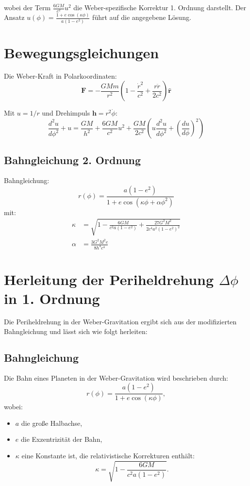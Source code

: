 wobei der Term \(\frac{6GM}{c^2} u^2\) die Weber-spezifische Korrektur 1. Ordnung darstellt. Der Ansatz \(u(\phi) = \frac{1 + e \cos(\kappa\phi)}{a(1 - e^2)}\) führt auf die angegebene Lösung.

\section{Bewegungsgleichungen}
Die Weber-Kraft in Polarkoordinaten:
\begin{equation}
\mathbf{F} = -\frac{GMm}{r^2}\left(1 - \frac{\dot{r}^2}{c^2} + \frac{r\ddot{r}}{2c^2}\right)\mathbf{\hat{r}}
\end{equation}

Mit $u=1/r$ und Drehimpuls $\mathbf{h}=r^2\dot{\phi}$:
\begin{equation}
\frac{d^2u}{d\phi^2} + u = \frac{GM}{h^2} + \frac{6GM}{c^2}u^2 + \frac{GM}{2c^2}\left(u\frac{d^2u}{d\phi^2} + \left(\frac{du}{d\phi}\right)^2\right)
\end{equation}

\subsection{Bahngleichung 2. Ordnung}
Bahngleichung:
\begin{equation}
    \boxed
    {
        r(\phi) = \frac{a(1-e^2)}{1 + e\cos\left(\kappa\phi + \alpha\phi^2\right)}
    }
\end{equation}
mit:
\begin{align}
\kappa &= \sqrt{1 - \frac{6GM}{c^2a(1-e^2)} + \frac{27G^2M^2}{2c^4a^2(1-e^2)^2}}\\
\alpha &= \frac{3G^2M^2e}{8h^4c^4}
\end{align}

\section{Herleitung der Periheldrehung $\Delta\phi$ in 1. Ordnung}

Die Periheldrehung in der Weber-Gravitation ergibt sich aus der modifizierten Bahngleichung und lässt sich wie folgt herleiten:

\subsection{Bahngleichung}
Die Bahn eines Planeten in der Weber-Gravitation wird beschrieben durch:
\begin{equation}
r(\phi) = \frac{a(1 - e^2)}{1 + e \cos(\kappa\phi)},
\end{equation}
wobei:
\begin{itemize}
\item $a$ die große Halbachse,
\item $e$ die Exzentrizität der Bahn,
\item $\kappa$ eine Konstante ist, die relativistische Korrekturen enthält:
\begin{equation}
\kappa = \sqrt{1 - \frac{6GM}{c^2 a(1 - e^2)}}.
\end{equation}
\end{itemize}

